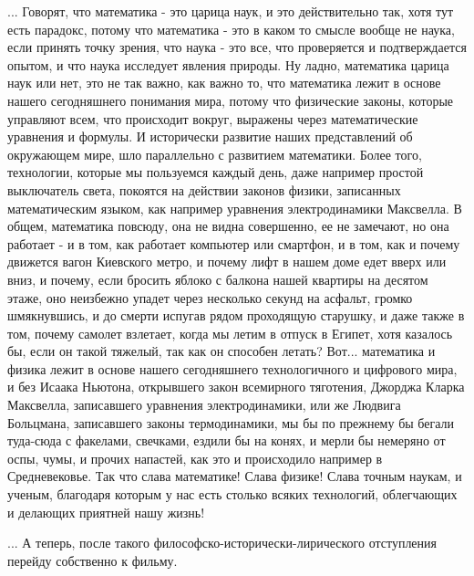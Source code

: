 ... Говорят, что математика - это царица наук, и это действительно так, хотя
тут есть парадокс, потому что математика - это в каком то смысле вообще не
наука, если принять точку зрения, что наука - это все, что проверяется и
подтверждается опытом, и что наука исследует явления природы. Ну ладно,
математика царица наук или нет, это не так важно, как важно то, что математика
лежит в основе нашего сегодняшнего понимания мира, потому что физические
законы, которые управляют всем, что происходит вокруг, выражены через
математические уравнения и формулы. И исторически развитие наших представлений
об окружающем мире, шло параллельно с развитием математики.  Более того,
технологии, которые мы пользуемся каждый день, даже например простой
выключатель света, покоятся на действии законов физики, записанных
математическим языком, как например уравнения электродинамики Максвелла.  В
общем, математика повсюду, она не видна совершенно, ее не замечают, но она
работает - и в том, как работает компьютер или смартфон, и в том, как и почему
движется вагон Киевского метро, и почему лифт в нашем доме едет вверх или вниз,
и почему, если бросить яблоко с балкона нашей квартиры на десятом этаже, оно
неизбежно упадет через несколько секунд на асфальт, громко шмякнувшись, и до
смерти испугав рядом проходящую старушку, и даже также в том, почему самолет
взлетает, когда мы летим в отпуск в Египет, хотя казалось бы, если он такой
тяжелый, так как он способен летать? Вот... математика и физика лежит в основе
нашего сегодняшнего технологичного и цифрового мира, и без Исаака Ньютона,
открывшего закон всемирного тяготения, Джорджа Кларка Максвелла, записавшего
уравнения электродинамики, или же Людвига Больцмана, записавшего законы
термодинамики, мы бы по прежнему бы бегали туда-сюда с факелами, свечками,
ездили бы на конях, и мерли бы немеряно от оспы, чумы, и прочих напастей, как
это и происходило например в Средневековье. Так что слава математике! Слава
физике! Слава точным наукам, и ученым, благодаря которым у нас есть столько
всяких технологий, облегчающих и делающих приятней нашу жизнь!

... А теперь, после такого философско-исторически-лирического отступления
перейду собственно к фильму.
